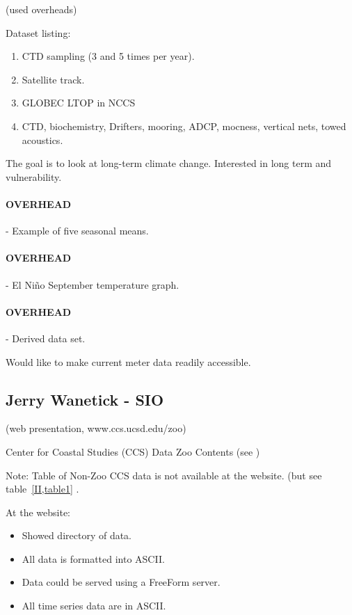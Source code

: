  (used overheads)

Dataset listing:
\begin{enumerate}
\item CTD sampling (3 and 5 times per year).
\item Satellite track.
\item GLOBEC LTOP in NCCS
\item CTD, biochemistry, Drifters, mooring, ADCP, mocness, vertical
  nets, towed acoustics.
\end{enumerate}


The goal is to look at long-term climate change.  Interested in long term and 
vulnerability.

\paragraph{OVERHEAD} - Example of five seasonal means.

\paragraph{OVERHEAD} - El Ni\~no September temperature graph.

\paragraph{OVERHEAD} - Derived data set.

Would like to make current meter data readily accessible.


\subsection{Jerry Wanetick - SIO}

(web presentation, www.ccs.ucsd.edu/zoo)

Center for Coastal Studies (CCS) Data Zoo Contents (see )

Note:  Table of Non-Zoo CCS data is not available at the website. (but
see table~\ref{II,table1} .

At the website: 
\begin{itemize}
\item Showed directory of data.
\item All data is formatted into ASCII.
\item Data could be served using a FreeForm server.
\item All time series data are in ASCII.
\end{itemize}

